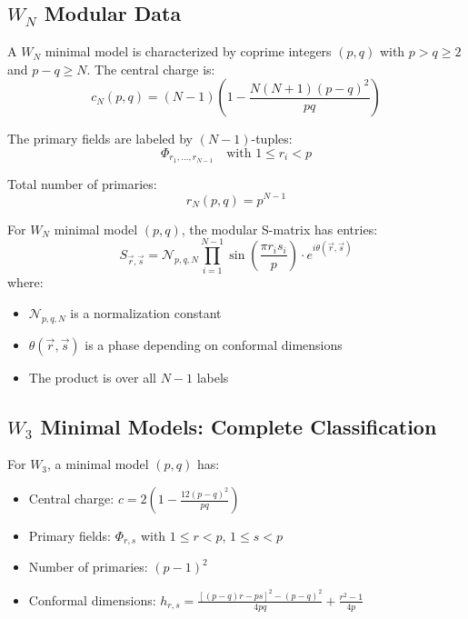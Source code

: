 \subsection{$W_N$ Modular Data}
\label{subsec:wn-modular-data}

\begin{definition}\label{def:wn-minimal}
A $W_N$ minimal model is characterized by coprime integers $(p,q)$ with $p > q \geq 2$ 
and $p - q \geq N$. The central charge is:
\begin{equation}
c_{N}(p,q) = (N-1)\left(1 - \frac{N(N+1)(p-q)^2}{pq}\right)
\end{equation}

The primary fields are labeled by $(N-1)$-tuples:
$$\Phi_{r_1, \ldots, r_{N-1}} \quad \text{with } 1 \leq r_i < p$$

Total number of primaries:
$$r_N(p,q) = p^{N-1}$$
\end{definition}

\begin{theorem}\label{thm:wn-s-matrix}
For $W_N$ minimal model $(p,q)$, the modular S-matrix has entries:
\begin{equation}
S_{\vec{r},\vec{s}} = \mathcal{N}_{p,q,N} \prod_{i=1}^{N-1} 
\sin\left(\frac{\pi r_i s_i}{p}\right) \cdot e^{i\theta(\vec{r},\vec{s})}
\end{equation}
where:
\begin{itemize}
\item $\mathcal{N}_{p,q,N}$ is a normalization constant
\item $\theta(\vec{r},\vec{s})$ is a phase depending on conformal dimensions
\item The product is over all $N-1$ labels
\end{itemize}
\end{theorem}

\subsection{$W_3$ Minimal Models: Complete Classification}
\label{subsec:w3-minimal-complete}

\begin{theorem}\label{thm:w3-minimal-complete}
For $W_3$, a minimal model $(p,q)$ has:
\begin{itemize}
\item Central charge: $c = 2\left(1 - \frac{12(p-q)^2}{pq}\right)$
\item Primary fields: $\Phi_{r,s}$ with $1 \leq r < p$, $1 \leq s < p$
\item Number of primaries: $(p-1)^2$
\item Conformal dimensions: $h_{r,s} = \frac{[(p-q)r - ps]^2 - (p-q)^2}{4pq} + 
\frac{r^2 - 1}{4p}$
\end{itemize}
\end{theorem}

